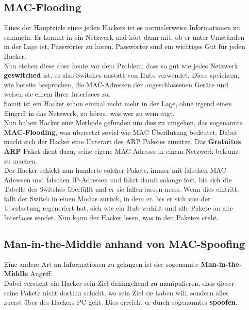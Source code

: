 \documentclass[12pt,a4paper]{report}
\begin{document}
\begin{onehalfspace}
\subsection{MAC-Flooding}\label{ssec:mflood}
Eines der Hauptziele eines jeden Hackers ist es normalerweise Informationen zu sammeln. Er kommt in ein Netzwerk und hört dann mit, ob er unter Umständen in der Lage ist, Passwörter zu hören. Passwörter sind ein wichtiges Gut für jeden Hacker.\\
Nun stehen diese aber heute vor dem Problem, dass so gut wie jedes Netzwerk \textbf{geswitched} ist, es also Switches anstatt von Hubs verwendet. Diese speichern, wie bereits besprochen, die MAC-Adressen der angeschlossenen Geräte und weisen sie einem ihrer Interfaces zu.\\
Somit ist ein Hacker schon einmal nicht mehr in der Lage, ohne irgend einen Eingriff in das Netzwerk, zu hören, was wer zu wem sagt.\\

Nun haben Hacker eine Methode gefunden um dies zu umgehen, das sogenannte \textbf{MAC-Flooding}, was übersetzt soviel wie MAC Überflutung bedeutet. Dabei macht sich der Hacker eine Unterart des ARP Paketes zunütze. Das \textbf{Gratuitos ARP} Paket dient dazu, seine eigene MAC-Adresse in einem Netzwerk bekannt zu machen.\\
Der Hacker schickt nun hunderte solcher Pakete, immer mit falschen MAC-Adressen und falschen IP-Adressen und fährt damit solange fort, bis sich die Tabelle des Switches überfüllt und er sie fallen lassen muss. Wenn dies eintritt, fällt der Switch in einen Modus zurück, in dem er, bis er sich von der Überlastung regeneriert hat, sich wie ein Hub verhält und alle Pakete an alle Interfaces sendet. Nun kann der Hacker lesen, was in den Paketen steht.\\

\subsection{Man-in-the-Middle anhand von MAC-Spoofing}\label{ssec:mspoof}
Eine andere Art an Informationen zu gelangen ist der sogenannte \textbf{Man-in-the-Middle} Angriff.\\
Dabei versucht ein Hacker sein Ziel dahingehend zu manipulieren, dass dieser seine Pakete nicht dorthin schickt, wo sein Ziel sie haben will, sondern alles zuerst über des Hackers PC geht. Dies erreicht er durch sogenanntes \textbf{spoofen}.\\


\end{onehalfspace}
\end{document}
